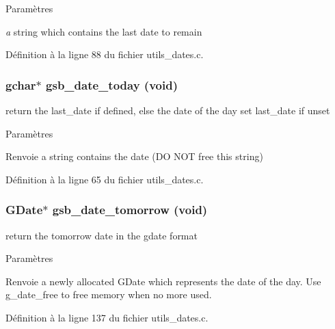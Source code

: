 \begin{DoxyParams}{Paramètres}
\item[{\em a}]string which contains the last date to remain \end{DoxyParams}


Définition à la ligne 88 du fichier utils\_\-dates.c.

\subsubsection[{gsb\_\-date\_\-today}]{\setlength{\rightskip}{0pt plus 5cm}gchar$\ast$ gsb\_\-date\_\-today (void)}\label{utils__dates_8h_af4555330ab5823ec03ff9388cca24e58}
return the last\_\-date if defined, else the date of the day set last\_\-date if unset


\begin{DoxyParams}{Paramètres}
\item[{\em }]\end{DoxyParams}
\begin{DoxyReturn}{Renvoie}
a string contains the date (DO NOT free this string) 
\end{DoxyReturn}


Définition à la ligne 65 du fichier utils\_\-dates.c.

\subsubsection[{gsb\_\-date\_\-tomorrow}]{\setlength{\rightskip}{0pt plus 5cm}GDate$\ast$ gsb\_\-date\_\-tomorrow (void)}\label{utils__dates_8h_a527126308515106069bf3e5b2fc100ef}
return the tomorrow date in the gdate format


\begin{DoxyParams}{Paramètres}
\item[{\em }]\end{DoxyParams}
\begin{DoxyReturn}{Renvoie}
a newly allocated GDate which represents the date of the day. Use g\_\-date\_\-free to free memory when no more used. 
\end{DoxyReturn}


Définition à la ligne 137 du fichier utils\_\-dates.c.

